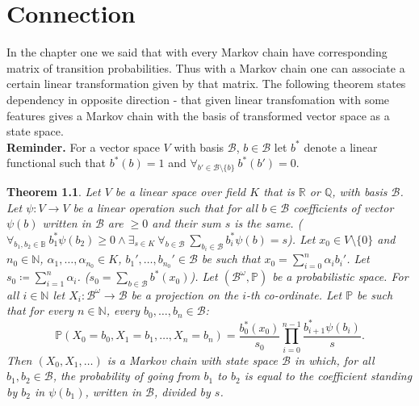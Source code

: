 \documentclass[a4paper, 12pt]{report}
\newtheorem{theorem}{Theorem}
\newcommand{\ndotsm}[3]{{#1}_{#2}, \dots, {#1}_{#3}}
\begin{document}
\chapter{Connection}
\indent In the chapter one we said that with every Markov chain  have corresponding matrix of transition
probabilities. Thus with a Markov chain one can associate a certain linear transformation given by that
matrix. The following theorem states dependency in opposite direction - that given linear transfomation
with some features gives a Markov chain with the basis of transformed vector space as a state space. \\[8pt]
\indent\textbf{Reminder. } For a vector space $V$ with basis $\mathcal{B}$,
$b \in \mathcal{B}$ let $b^*$
denote a linear functional such that $b^*(b) = 1$ and
$\forall_{b' \in \mathcal{B}\setminus \{b\}}\ b^*(b') = 0$.
\begin{theorem}
Let $V$ be a linear space over field $K$ that is $\mathbb{R}$ or $\mathbb{Q}$,
 with basis $\mathcal{B}$.
Let $\psi : V \to V$ be a linear operation such that for
all $b \in \mathcal{B}$ coefficients of vector $\psi(b)$ written in $\mathcal{B}$ are $\geq 0$ and their
sum $s$ is the same.
($\forall_{b_1, b_2 \in \mathbb{B}}\ b_1^*\psi(b_2) \geq 0 \land \exists_{s \in K}\ \forall_{b \in \mathcal{B}}\ \displaystyle\sum_{b_i \in \mathcal{B}}b_i^*\psi(b) = s$).
Let $x_0 \in V\setminus\{0\}$ and
$n_0 \in \mathbb{N}$, $\alpha_1, \dots, \alpha_{n_0} \in K$, $b_1', \dots, b_{n_0}' \in \mathcal{B}$
be such that $x_0 = \displaystyle\sum_{i = 0}^n \alpha_i b_i'$. Let $s_0 \coloneqq
\displaystyle\sum_{i = 1}^n \alpha_i$. ($s_0 = \displaystyle\sum_{b \in \mathcal{B}} b^*(x_0)$).
Let $(\mathcal{B}^\omega, \mathbb{P})$ be a probabilistic space. For all $i \in \mathbb{N}$ let
$X_i : \mathcal{B}^\omega \to \mathcal{B}$ be a projection on the $i$-th co-ordinate.
Let $\mathbb{P}$ be such that for every $n \in \mathbb{N}$, every
$\ndotsm{b}{0}{n} \in \mathcal{B}$:
\begin{equation*}
\mathbb{P}(X_0 = b_0, X_1 = b_1, \dots, X_n = b_n) =
\frac{b_0^*(x_0)}{s_0}\prod_{i = 0}^{n-1}\frac{b_{i+1}^*\psi(b_i)}{s}.
\end{equation*}
Then $(X_0, X_1, \dots)$ is a Markov chain with state space $\mathcal{B}$
in which, for all $b_1, b_2 \in \mathcal{B}$, the probability of going from $b_1$ to $b_2$ is equal to the
coefficient standing by $b_2$ in $\psi(b_1)$, written in $\mathcal{B}$, divided by $s$.
\end{theorem}
\end{document}
